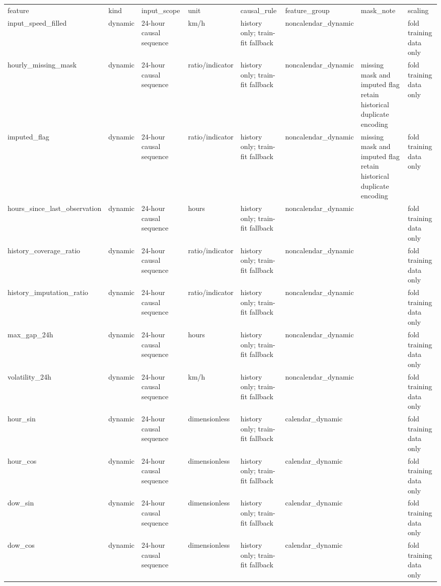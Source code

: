 \begin{longtable}{llllllll}
feature & kind & input\_scope & unit & causal\_rule & feature\_group & mask\_note & scaling \\
input\_speed\_filled & dynamic & 24-hour causal sequence & km/h & history only; train-fit fallback & noncalendar\_dynamic &  & fold training data only \\
hourly\_missing\_mask & dynamic & 24-hour causal sequence & ratio/indicator & history only; train-fit fallback & noncalendar\_dynamic & missing mask and imputed flag retain historical duplicate encoding & fold training data only \\
imputed\_flag & dynamic & 24-hour causal sequence & ratio/indicator & history only; train-fit fallback & noncalendar\_dynamic & missing mask and imputed flag retain historical duplicate encoding & fold training data only \\
hours\_since\_last\_observation & dynamic & 24-hour causal sequence & hours & history only; train-fit fallback & noncalendar\_dynamic &  & fold training data only \\
history\_coverage\_ratio & dynamic & 24-hour causal sequence & ratio/indicator & history only; train-fit fallback & noncalendar\_dynamic &  & fold training data only \\
history\_imputation\_ratio & dynamic & 24-hour causal sequence & ratio/indicator & history only; train-fit fallback & noncalendar\_dynamic &  & fold training data only \\
max\_gap\_24h & dynamic & 24-hour causal sequence & hours & history only; train-fit fallback & noncalendar\_dynamic &  & fold training data only \\
volatility\_24h & dynamic & 24-hour causal sequence & km/h & history only; train-fit fallback & noncalendar\_dynamic &  & fold training data only \\
hour\_sin & dynamic & 24-hour causal sequence & dimensionless & history only; train-fit fallback & calendar\_dynamic &  & fold training data only \\
hour\_cos & dynamic & 24-hour causal sequence & dimensionless & history only; train-fit fallback & calendar\_dynamic &  & fold training data only \\
dow\_sin & dynamic & 24-hour causal sequence & dimensionless & history only; train-fit fallback & calendar\_dynamic &  & fold training data only \\
dow\_cos & dynamic & 24-hour causal sequence & dimensionless & history only; train-fit fallback & calendar\_dynamic &  & fold training data only \\

\end{longtable}

